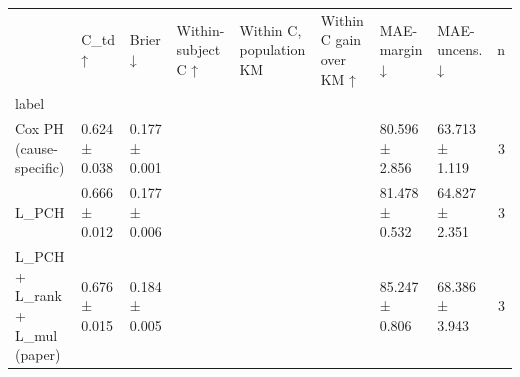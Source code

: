 \begin{tabular}{llllllllr}
\toprule
 & C\_td ↑ & Brier ↓ & Within-subject C ↑ & Within C, population KM & Within C gain over KM ↑ & MAE-margin ↓ & MAE-uncens. ↓ & n \\
label &  &  &  &  &  &  &  &  \\
\midrule
Cox PH (cause-specific) & 0.624 ± 0.038 & 0.177 ± 0.001 &  &  &  & 80.596 ± 2.856 & 63.713 ± 1.119 & 3 \\
L\_PCH & 0.666 ± 0.012 & 0.177 ± 0.006 &  &  &  & 81.478 ± 0.532 & 64.827 ± 2.351 & 3 \\
L\_PCH + L\_rank + L\_mul (paper) & 0.676 ± 0.015 & 0.184 ± 0.005 &  &  &  & 85.247 ± 0.806 & 68.386 ± 3.943 & 3 \\
\bottomrule
\end{tabular}
